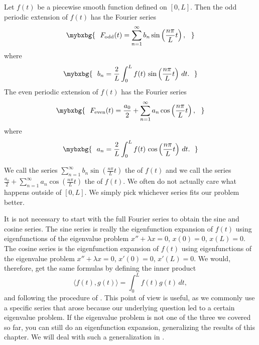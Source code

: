 \begin{theorem}
Let $f(t)$ be a piecewise smooth function defined on $[0,L]$.
Then the odd periodic extension
of $f(t)$ has the Fourier series
\begin{equation*}
\mybxbg{~~
F_{\text{odd}}(t) = \sum_{n=1}^\infty b_n \sin \left( \frac{n \pi}{L} t
\right) ,
~~}
\end{equation*}
where
\begin{equation*}
\mybxbg{~~
b_n = 
\frac{2}{L} \int_{0}^L f(t)\, \sin \left( \frac{n \pi}{L} t \right) \, dt .
~~}
\end{equation*}
The even periodic extension of $f(t)$ has the Fourier series
\begin{equation*}
\mybxbg{~~
F_{\text{even}}(t) = \frac{a_0}{2} + \sum_{n=1}^\infty a_n \cos \left(
\frac{n \pi}{L} t \right) ,
~~}
\end{equation*}
where
\begin{equation*}
\mybxbg{~~
a_n = 
\frac{2}{L} \int_{0}^L f(t)\, \cos \left( \frac{n \pi}{L} t \right) \, dt .
~~}
\end{equation*}
\end{theorem}

We call the series $\sum_{n=1}^\infty b_n \sin \left( \frac{n \pi}{L} t\right)$ 
the \emph{} of $f(t)$ and we call the series
$\frac{a_0}{2} + \sum_{n=1}^\infty a_n \cos \left( \frac{n \pi}{L} t
\right)$
the \emph{} of $f(t)$.  
We often do not actually care what happens outside of $[0,L]$.
We simply pick whichever series fits our problem better.

It is not necessary to start with the full Fourier series to obtain
the sine and cosine series.
The sine series is really the eigenfunction expansion of $f(t)$ using 
eigenfunctions of the eigenvalue problem $x''+\lambda x = 0$, $x(0) = 0$,
$x(L) = 0$.  The cosine series is the eigenfunction expansion of $f(t)$
using 
eigenfunctions of the eigenvalue problem $x''+\lambda x = 0$, $x'(0) = 0$,
$x'(L) = 0$.  We would, therefore, get the same formulas
by defining the inner product
\begin{equation*}
\langle f(t), g(t) \rangle = \int_0^L f(t) g(t) \, dt ,
\end{equation*}
and following the procedure of .  This point of view is
useful, as we commonly use a specific series that arose because our underlying
question 
led to a certain eigenvalue problem.  If the eigenvalue 
problem is not one of the three we covered so far, you can still do an
eigenfunction expansion, generalizing the results of this chapter.  We will
deal with such a generalization in .


